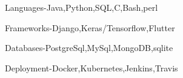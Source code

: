 

\begin{cventries}
        {}
        {}
        {}
        {}
        {
            \begin{cvitems}
                \item{Languages-Java,Python,SQL,C,Bash,perl}
                \item{Frameworks-Django,Keras/Tensorflow,Flutter}
                \item{Databases-PostgreSql,MySql,MongoDB,sqlite}
                \item{Deployment-Docker,Kubernetes,Jenkins,Travis}
            \end{cvitems}
        }

\end{cventries}
